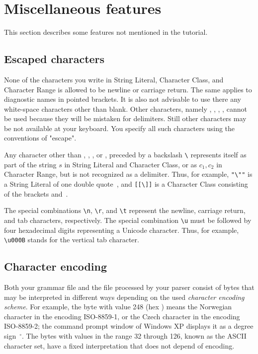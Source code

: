 
\section{Miscellaneous features}


This section describes some features not mentioned in the tutorial.

\subsection{Escaped characters\label{escape}}

None of the characters you write in String Literal, Character Class, and Character Range
is allowed to be newline or carriage return.
The same applies to diagnostic names in pointed brackets.
It is also not advisable to use there any white-space characters other than blank.
Other characters, namely , \tx{]}, \tx{-}, \tx{>}, cannot be used because they will be mistaken
for delimiters. 
Still other characters may be not available at your keyboard.
You specify all such characters using the conventions of "escape". 

Any character other than , , , or ,
preceded by a backslash \verb#\# represents itself as part of the string $s$
in String Literal and Character Class,
or as $c_1, c_2$ in Character Range, but is not recognized as a delimiter.
Thus, for example, \verb#"\""# is a String Literal of one double quote~,
and \verb#[[\]]# is a Character Class consisting of the brackets \tx{[} and~\tx{]}.

The special combinations \verb#\n#, \verb#\r#, and \verb#\t# represent
the newline, carriage return, and tab characters, respectively.
The special combination \verb#\u# must be followed by four hexadecimal digits
representing a Unicode character. 
Thus, for example, \verb#\u000B# stands for the vertical tab character.


\subsection{Character encoding}

Both your grammar file and the file processed by your parser 
consist of bytes
that may be interpreted in different ways
depending on the used \emph{character encoding scheme}.
For example, the byte with value 248 (hex ) means the Norwegian character \tx{\o} 
in the encoding ISO-8859-1, or the Czech character 
in the encoding ISO-8859-2;
the command prompt window of Windows XP displays it as a degree sign~$ ^\circ$.
The bytes with values in the range 32 through 126, known as the ASCII character set,
have a fixed interpretation that does not depend of encoding.

